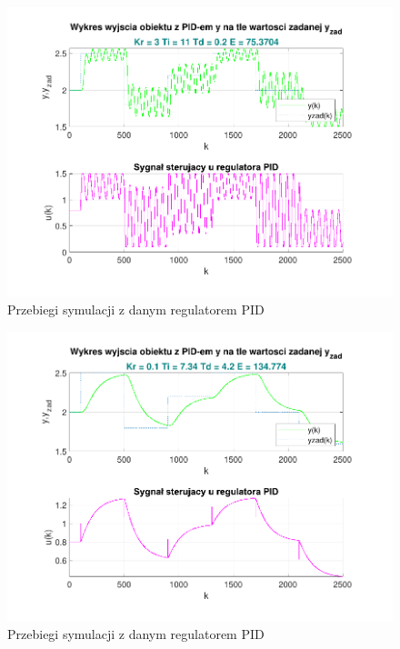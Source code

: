 \begin{figure}[H]
    \centering
    \includegraphics[scale=0.90]{../projekt/zad4_5/PID_pdf/PID_1.pdf}
    \caption{Przebiegi symulacji z danym regulatorem PID}
\end{figure}

\begin{figure}[H]
    \centering
    \includegraphics[scale=0.90]{../projekt/zad4_5/PID_pdf/PID_2.pdf}
    \caption{Przebiegi symulacji z danym regulatorem PID}
\end{figure}

